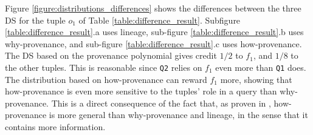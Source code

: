 Figure \ref{figure:distributions_differences} shows the differences between the three DS for the tuple $o_1$ of Table \ref{table:difference_result}. Subfigure \ref{table:difference_result}.a uses lineage, sub-figure \ref{table:difference_result}.b uses why-provenance, and sub-figure \ref{table:difference_result}.c uses how-provenance. 
The DS based on the provenance polynomial gives credit $1/2$ to $f_1$, and $1/8$ to the other tuples.
This is reasonable since \texttt{Q2} relies on $f_1$ even more than \texttt{Q1} does. 
The distribution based on how-provenance can reward $f_1$ more, showing that how-provenance is even more sensitive to the tuples' role in a query than why-provenance. %
This is a direct consequence of the fact that, as proven in \citep{howProvenanceGreen}, how-provenance is more general than why-provenance and lineage, in the sense that it contains more information. 
